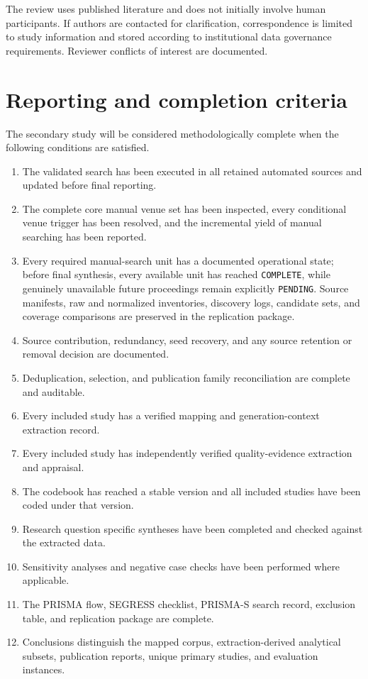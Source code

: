 The review uses published literature and does not initially involve human participants. If authors are contacted for clarification, correspondence is limited to study information and stored according to institutional data governance requirements. Reviewer conflicts of interest are documented.

\section{Reporting and completion criteria}
\label{sec:protocol_reporting}

The secondary study will be considered methodologically complete when the following conditions are satisfied.

\begin{enumerate}[label=\arabic*)]
    \item The validated search has been executed in all retained automated sources and updated before final reporting.
    \item The complete core manual venue set has been inspected, every conditional venue trigger has been resolved, and the incremental yield of manual searching has been reported.
    \item Every required manual-search unit has a documented operational state; before final synthesis, every available unit has reached \texttt{COMPLETE}, while genuinely unavailable future proceedings remain explicitly \texttt{PENDING}. Source manifests, raw and normalized inventories, discovery logs, candidate sets, and coverage comparisons are preserved in the replication package.
    \item Source contribution, redundancy, seed recovery, and any source retention or removal decision are documented.
    \item Deduplication, selection, and publication family reconciliation are complete and auditable.
    \item Every included study has a verified mapping and generation-context extraction record.
    \item Every included study has independently verified quality-evidence extraction and appraisal.
    \item The codebook has reached a stable version and all included studies have been coded under that version.
    \item Research question specific syntheses have been completed and checked against the extracted data.
    \item Sensitivity analyses and negative case checks have been performed where applicable.
    \item The PRISMA flow, SEGRESS checklist, PRISMA-S search record, exclusion table, and replication package are complete.
    \item Conclusions distinguish the mapped corpus, extraction-derived analytical subsets, publication reports, unique primary studies, and evaluation instances.
\end{enumerate}

